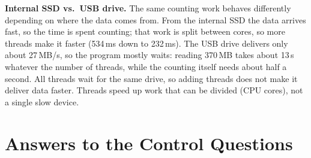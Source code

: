 \documentclass[12pt,a4paper]{article}
\begin{document}
\textbf{Internal SSD vs.\ USB drive.} The same counting work behaves differently depending on where
the data comes from. From the internal SSD the data arrives fast, so the time is spent counting;
that work is split between cores, so more threads make it faster (534\,ms down to 232\,ms). The
USB drive delivers only about 27\,MB/s, so the program mostly waits: reading 370\,MB takes about
13\,s whatever the number of threads, while the counting itself needs about half a second. All
threads wait for the same drive, so adding threads does not make it deliver data faster.
Threads speed up work that can be divided (CPU cores), not a single slow device.

\section{Answers to the Control Questions}
\end{document}
